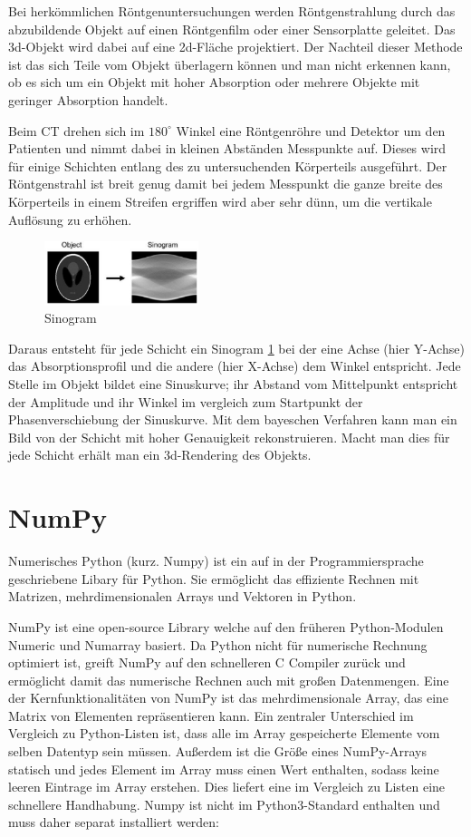 \documentclass[]{dsadokumentation}
\begin{document}
Bei herkömmlichen Röntgenuntersuchungen werden Röntgenstrahlung durch das abzubildende Objekt auf einen Röntgenfilm oder einer Sensorplatte geleitet. Das 3d-Objekt wird dabei auf eine 2d-Fläche projektiert. Der Nachteil dieser Methode ist das sich Teile vom Objekt überlagern können und man nicht erkennen kann, ob es sich um ein Objekt mit hoher Absorption oder mehrere Objekte mit geringer Absorption handelt.

Beim CT drehen sich im $180^\circ$ Winkel eine Röntgenröhre und Detektor um den Patienten und nimmt dabei in kleinen Abständen Messpunkte auf. Dieses wird für einige Schichten entlang des zu untersuchenden Körperteils ausgeführt. Der Röntgenstrahl ist breit genug damit bei jedem Messpunkt die ganze breite des Körperteils in einem Streifen ergriffen wird aber sehr dünn, um die vertikale Auflösung zu erhöhen.

\begin{figure}
  \includegraphics[width=0.4\textwidth]{k4.2/backprojektion.png}
  \caption{Sinogram}
  \label{k4.2.tomo.ct.bp}
\end{figure}

Daraus entsteht für jede Schicht ein Sinogram \cref{k4.2.tomo.ct.bp} bei der eine Achse (hier Y-Achse) das Absorptionsprofil und die andere (hier X-Achse) dem Winkel entspricht. Jede Stelle im Objekt bildet eine Sinuskurve; ihr Abstand vom Mittelpunkt entspricht der Amplitude und ihr Winkel im vergleich zum Startpunkt der Phasenverschiebung der Sinuskurve. Mit dem bayeschen Verfahren  kann man ein Bild von der Schicht mit hoher Genauigkeit rekonstruieren. Macht man dies für jede Schicht erhält man ein 3d-Rendering des Objekts.

\section{NumPy}\label{k4.2.ch.NumPy}
Numerisches Python (kurz. Numpy) ist ein auf in der Programmiersprache geschriebene Libary für Python. Sie ermöglicht das effiziente Rechnen mit Matrizen, mehrdimensionalen Arrays und Vektoren in Python.

NumPy ist eine open-source Library welche auf den früheren Python-Modulen Numeric und Numarray basiert. Da Python nicht für numerische Rechnung optimiert ist, greift NumPy auf den schnelleren C Compiler zurück und ermöglicht damit das numerische Rechnen auch mit großen Datenmengen. Eine der Kernfunktionalitäten von NumPy ist das mehrdimensionale Array, das eine Matrix von Elementen repräsentieren kann. Ein zentraler Unterschied im Vergleich zu Python-Listen ist, dass alle im Array gespeicherte Elemente vom selben Datentyp sein müssen. Außerdem ist die Größe eines NumPy-Arrays statisch und jedes Element im Array muss einen Wert enthalten, sodass keine leeren Eintrage im Array erstehen. Dies liefert eine im Vergleich zu Listen eine schnellere Handhabung.
Numpy ist nicht im Python3-Standard enthalten und muss daher separat installiert werden:
\end{document}
